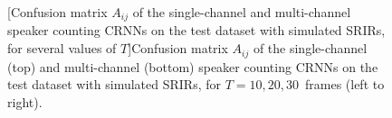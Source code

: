 \begin{figure}[t]
    
    [Confusion matrix $A_{ij}$ of the single-channel and multi-channel speaker counting CRNNs on the test dataset with simulated SRIRs, for several values of $T$]{Confusion matrix $A_{ij}$ of the single-channel (top) and multi-channel (bottom) speaker counting CRNNs on the test dataset with simulated SRIRs, for $T = 10, 20, 30$~frames (left to right).}
    \label{fig:confusionMatricesSingleMultiSimulated}
\end{figure}

